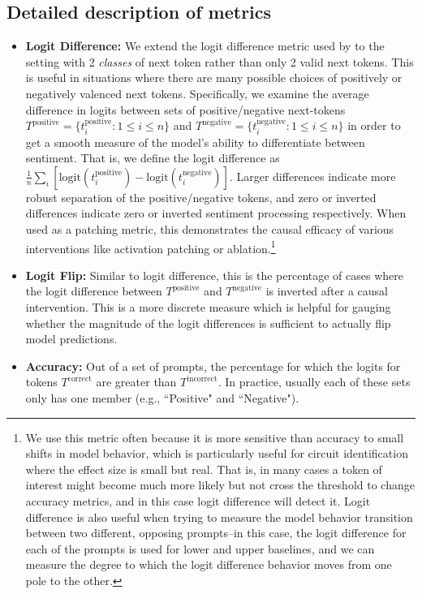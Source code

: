 \documentclass{article} %
\begin{document}
        \subsection{Detailed description of metrics}\label{section:detailed-metrics}
            \begin{itemize}
                \item \textbf{Logit Difference:} We extend the logit difference metric used by \citet{ioi} to the setting with 2 \textit{classes} of next token rather than only 2 valid next tokens. This is useful in situations where there are many possible choices of positively or negatively valenced next tokens. Specifically, we examine the average difference in logits between sets of positive/negative next-tokens $T^\text{positive}=\{t^\text{positive}_i: 1 \leq i \leq n\}$ and $T^\text{negative}=\{t_i^\text{negative}: 1 \leq i \leq n\}$ in order to get a smooth measure of the model's ability to differentiate between sentiment. That is, we define the logit difference as $\frac{1}{n}\sum_i \left[\mathrm{logit}(t^\text{positive}_i) - \mathrm{logit}(t_i^\text{negative})\right]$. Larger differences indicate more robust separation of the positive/negative tokens, and zero or inverted differences indicate zero or inverted sentiment processing respectively. When used as a \gls{patching metric}, this demonstrates the causal efficacy of various interventions like activation patching or ablation.\footnote{We use this metric often because it is more sensitive than accuracy to small shifts in model behavior, which is particularly useful for circuit identification where the effect size is small but real. That is, in many cases a token of interest might become much more likely but not cross the threshold to change accuracy metrics, and in this case logit difference will detect it. Logit difference is also useful when trying to measure the model behavior transition between two different, opposing prompts--in this case, the logit difference for each of the prompts is used for lower and upper baselines, and we can measure the degree to which the logit difference behavior moves from one pole to the other.}
                \item \textbf{Logit Flip:} Similar to logit difference, this is the percentage of cases where the logit difference between $T^\text{positive}$ and $T^\text{negative}$ is inverted after a causal intervention. This is a more discrete measure which is helpful for gauging whether the magnitude of the logit differences is sufficient to actually flip model predictions.
                \item \textbf{Accuracy:} Out of a set of prompts, the percentage for which the logits for tokens $T^\text{correct}$ are greater than $T^\text{incorrect}$. In practice, usually each of these sets only has one member (e.g., ``Positive" and ``Negative").
            \end{itemize}
\end{document}
